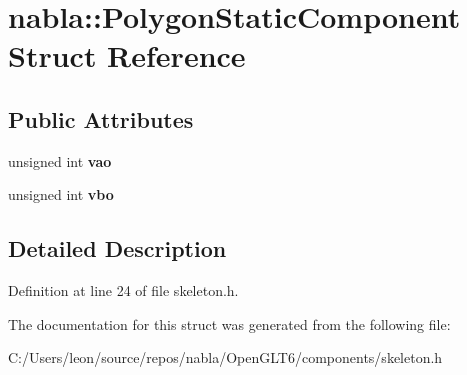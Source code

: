 \hypertarget{structnabla_1_1_polygon_static_component}{}\section{nabla\+::Polygon\+Static\+Component Struct Reference}
\label{structnabla_1_1_polygon_static_component}
\subsection*{Public Attributes}
\begin{DoxyCompactItemize}
\item 
\mbox{\label{structnabla_1_1_polygon_static_component_abdd8665db30223347a7f0f223313693f}} 
unsigned int {\bfseries vao}
\item 
\mbox{\label{structnabla_1_1_polygon_static_component_a5fa40c6f59d8b96daa4f575385ce05c7}} 
unsigned int {\bfseries vbo}
\end{DoxyCompactItemize}


\subsection{Detailed Description}


Definition at line 24 of file skeleton.\+h.



The documentation for this struct was generated from the following file\+:\begin{DoxyCompactItemize}
\item 
C\+:/\+Users/leon/source/repos/nabla/\+Open\+G\+L\+T6/components/skeleton.\+h\end{DoxyCompactItemize}
